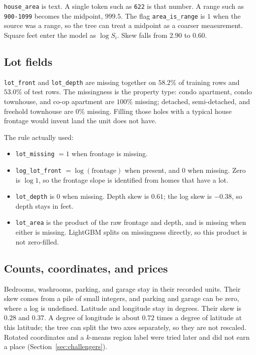 \documentclass[11pt]{article}
\begin{document}
\texttt{house\_area} is text. A single token such as \texttt{622} is that number. A range such as \texttt{900-1099} becomes the midpoint, \(999.5\). The flag \texttt{area\_is\_range} is \(1\) when the source was a range, so the tree can treat a midpoint as a coarser measurement. Square feet enter the model as \(\log S_i\). Skew falls from \(2.90\) to \(0.60\).

\subsection{Lot fields}

\texttt{lot\_front} and \texttt{lot\_depth} are missing together on \(58.2\%\) of training rows and \(53.0\%\) of test rows. The missingness is the property type: condo apartment, condo townhouse, and co-op apartment are \(100\%\) missing; detached, semi-detached, and freehold townhouse are \(0\%\) missing. Filling those holes with a typical house frontage would invent land the unit does not have.

The rule actually used:

\begin{itemize}
\item \texttt{lot\_missing} \(= 1\) when frontage is missing.
\item \texttt{log\_lot\_front} \(= \log(\text{frontage})\) when present, and \(0\) when missing. Zero is \(\log 1\), so the frontage slope is identified from homes that have a lot.
\item \texttt{lot\_depth} is \(0\) when missing. Depth skew is \(0.61\); the log skew is \(-0.38\), so depth stays in feet.
\item \texttt{lot\_area} is the product of the raw frontage and depth, and is missing when either is missing. LightGBM splits on missingness directly, so this product is not zero-filled.
\end{itemize}

\subsection{Counts, coordinates, and prices}

Bedrooms, washrooms, parking, and garage stay in their recorded units. Their skew comes from a pile of small integers, and parking and garage can be zero, where a log is undefined. Latitude and longitude stay in degrees. Their skew is \(0.28\) and \(0.37\). A degree of longitude is about \(0.72\) times a degree of latitude at this latitude; the tree can split the two axes separately, so they are not rescaled. Rotated coordinates and a \(k\)-means region label were tried later and did not earn a place (Section~\ref{sec:challengers}).
\end{document}
